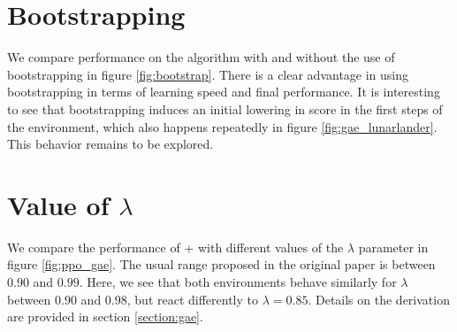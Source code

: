 %

\section{Bootstrapping}

We compare performance on the \ppo algorithm with and without the use of bootstrapping in figure \ref{fig:bootstrap}. There is a clear advantage in using bootstrapping in terms of learning speed and final performance. It is interesting to see that bootstrapping induces an initial lowering in score in the first steps of the  environment, which also happens repeatedly in figure \ref{fig:gae_lunarlander}. This behavior remains to be explored.



\section{Value of \gae $\lambda$}

We compare the performance of \ppo + \gae with different values of the $\lambda$ parameter in figure \ref{fig:ppo_gae}. The usual range proposed in the original paper \cite{gae} is between $0.90$ and $0.99$. Here, we see that both environments behave similarly for $\lambda$ between $0.90$ and $0.98$, but react differently to $\lambda = 0.85$. Details on the \gae derivation are provided in section \ref{section:gae}.



